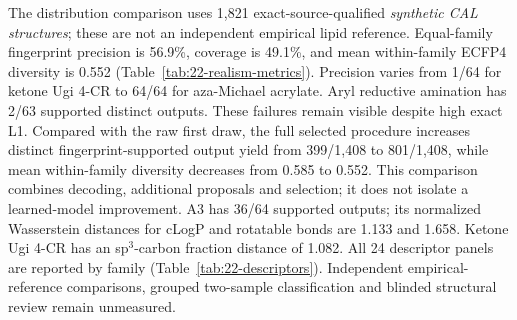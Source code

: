 The distribution comparison uses 1,821 exact-source-qualified \emph{synthetic CAL structures};
these are not an independent empirical lipid reference. Equal-family fingerprint precision is
56.9\%, coverage is 49.1\%, and mean within-family ECFP4 diversity is 0.552
(Table~\ref{tab:22-realism-metrics}). Precision varies from 1/64 for ketone Ugi 4-CR to 64/64 for
aza-Michael acrylate. Aryl reductive amination has 2/63 supported distinct outputs. These failures
remain visible despite high exact L1. Compared with the raw first draw, the full selected procedure
increases distinct fingerprint-supported output yield from 399/1,408 to 801/1,408, while mean
within-family diversity decreases from 0.585 to 0.552. This comparison combines decoding, additional
proposals and selection; it does not isolate a learned-model improvement. A3 has 36/64 supported outputs; its normalized Wasserstein
distances for cLogP and rotatable bonds are 1.133 and 1.658. Ketone Ugi 4-CR has an sp$^3$-carbon
fraction distance of 1.082. All 24 descriptor panels are reported by family
(Table~\ref{tab:22-descriptors}). Independent empirical-reference comparisons, grouped two-sample
classification and blinded structural review remain unmeasured.

